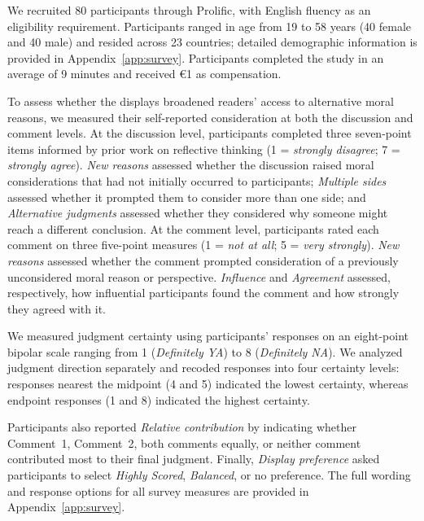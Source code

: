 We recruited 80 participants through Prolific, with English fluency
as an eligibility requirement. Participants ranged in age from 19 to 58 years (40 female and 40 male) and resided across 23 countries;
detailed demographic information is provided in Appendix~\ref{app:survey}. Participants completed the study in an average of 9 minutes and received €1 as compensation. 

To assess whether the displays broadened readers' access to alternative moral reasons, we measured their self-reported consideration at both the discussion and comment levels. 
At the discussion level,
participants completed three seven-point items informed by prior work
on reflective thinking
\citep{southworth2022bridging,kember2000development,
flavell1979metacognition}
(1 = \textit{strongly disagree}; 7 = \textit{strongly agree}).
\textit{New reasons} assessed whether the discussion raised moral
considerations that had not initially occurred to participants;
\textit{Multiple sides} assessed whether it prompted them to consider
more than one side; and \textit{Alternative judgments} assessed whether
they considered why someone might reach a different conclusion.
At the comment level, participants rated each comment on three five-point measures (1 = \textit{not at all}; 5 = \textit{very strongly}). \textit{New reasons} assessed whether the comment prompted consideration of a previously unconsidered moral reason or
perspective. \textit{Influence} and \textit{Agreement} assessed,
respectively, how influential participants found the comment and how
strongly they agreed with it. 

We measured judgment certainty using participants' responses on an
eight-point bipolar scale ranging from 1 (\textit{Definitely YA}) to 8 (\textit{Definitely NA}). 
We analyzed judgment direction separately and recoded responses into
four certainty levels: responses nearest the midpoint (4 and 5)
indicated the lowest certainty, whereas endpoint responses (1 and 8)
indicated the highest certainty.

Participants also reported \textit{Relative contribution} by indicating
whether Comment~1, Comment~2, both comments equally, or neither comment
contributed most to their final judgment. Finally,
\textit{Display preference} asked participants to select
\textit{Highly Scored}, \textit{Balanced}, or no preference. The full
wording and response options for all survey measures are provided in
Appendix~\ref{app:survey}.

